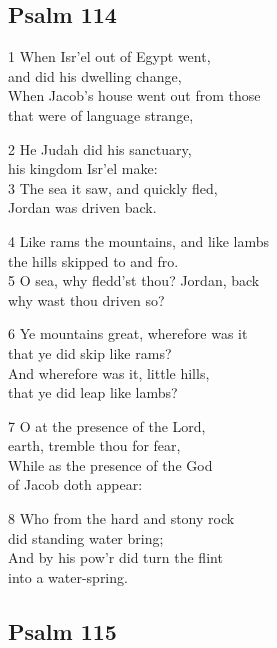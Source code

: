 \begin{center}
\quad{}\quad{}
\end{center}

\subsection*{Psalm 114}

1 When Isr’el out of Egypt went,\\
and did his dwelling change,\\
When Jacob’s house went out from those\\
that were of language strange,

2 He Judah did his sanctuary,\\
his kingdom Isr’el make:\\
3 The sea it saw, and quickly fled,\\
Jordan was driven back.

4 Like rams the mountains, and like lambs\\
the hills skipped to and fro.\\
5 O sea, why fledd’st thou? Jordan, back\\
why wast thou driven so?

6 Ye mountains great, wherefore was it\\
that ye did skip like rams?\\
And wherefore was it, little hills,\\
that ye did leap like lambs?

7 O at the presence of the Lord,\\
earth, tremble thou for fear,\\
While as the presence of the God\\
of Jacob doth appear:

8 Who from the hard and stony rock\\
did standing water bring;\\
And by his pow’r did turn the flint\\
into a water-spring.

\begin{center}
\quad{}\quad{}
\end{center}

\subsection*{Psalm 115}


